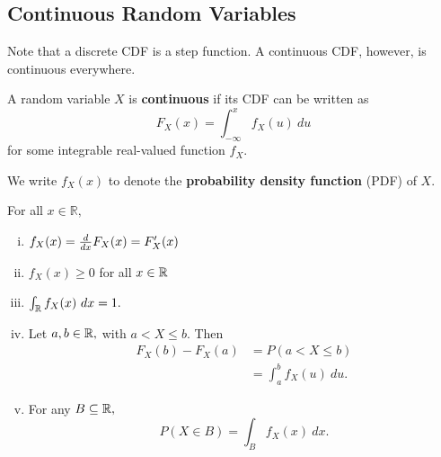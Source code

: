 \subsection{Continuous Random Variables}
Note that a discrete CDF is a step function. A continuous CDF, however, is continuous everywhere. 
\begin{definition}
A random variable $X$ is \textbf{continuous} if its CDF can be written as
$$
F_X(x)=\int^x_{-\infty}f_X(u) \ du 
$$
for some integrable real-valued function $f_X.$
\end{definition}

\begin{definition}
We write $f_X(x)$ to denote the \textbf{probability density function} (PDF) of $X.$
\end{definition}

\begin{prop}
For all $x\in \mathbb R,$ 
\begin{enumerate}[i.]
\item $f_X(x)=\frac{d}{dx} F_X(x)=F_X'(x)$
\item $f_X(x)\geq 0$ for all $x\in \mathbb R$
\item $\int_{\mathbb R} f_X(x) \ dx=1.$
\item Let $a,b\in \mathbb R,$ with $a<X\leq b.$ Then \begin{align*}
    F_X(b)-F_X(a)&=P(a<X\leq b) \\
    &= \int^b_af_X(u) \ du.
\end{align*}
\item For any $B\subseteq \mathbb R,$
$$
P(X\in B)=\int_B f_X(x) \ dx.
$$
\end{enumerate}
\end{prop}


